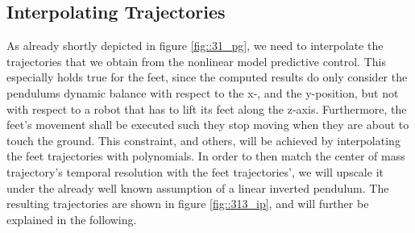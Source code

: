 \subsection{Interpolating Trajectories}
\label{sec::313_it}
As already shortly depicted in figure \ref{fig::31_pg}, we need to interpolate the trajectories that we obtain from the nonlinear model predictive control. This especially holds true for the feet, since the computed results do only consider the pendulums dynamic balance with respect to the x-, and the y-position, but not with respect to a robot that has to lift its feet along the z-axis. Furthermore, the feet's movement shall be executed such they stop moving when they are about to touch the ground. This constraint, and others, will be achieved by interpolating the feet trajectories with polynomials. In order to then match the center of mass trajectory's temporal resolution with the feet trajectories', we will upscale it under the already well known assumption of a linear inverted pendulum. The resulting trajectories are shown in figure \ref{fig::313_ip}, and will further be explained in the following. 
